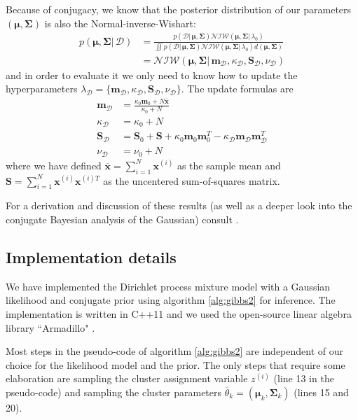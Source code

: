 \documentclass[final,3p,times,twocolumn]{elsarticle}
\let\bs\boldsymbol
\begin{document}
Because of conjugacy, we know that the posterior distribution of our parameters $(\bs\mu,\bs\Sigma)$ is also the Normal-inverse-Wishart:
\begin{equation}
\label{eqn:NIWpost}
\begin{split}
p(\bs\mu,\bs\Sigma|\,\mathcal{D}) &= \frac{p(\mathcal{D}|\,\bs\mu,\bs\Sigma)\mathcal{NIW}(\bs\mu,\bs\Sigma|\,\lambda_0)}{\iint p(\mathcal{D}|\,\bs\mu,\bs\Sigma)\mathcal{NIW}(\bs\mu,\bs\Sigma|\,\lambda_0)d(\bs\mu,\bs\Sigma)}\\
&= \mathcal{NIW}(\bs\mu,\bs\Sigma|\,\bs m_\mathcal{D},\kappa_\mathcal{D},\bs S_\mathcal{D},\nu_\mathcal{D})
\end{split}
\end{equation}
and in order to evaluate it we only need to know how to update the hyperparameters $\lambda_\mathcal{D} = \{\bs m_\mathcal{D},\kappa_\mathcal{D},\bs S_\mathcal{D},\nu_\mathcal{D}\}$.
The update formulas are
\begin{equation}
\begin{split}
\bs m_\mathcal{D} &= \frac{\kappa_0\bs m_0 + N \overline{\bs x}}{\kappa_0 + N}\\
\kappa_\mathcal{D} &= \kappa_0 + N\\
\bs S_\mathcal{D} &= \bs S_0 + \bs S + \kappa_0 \bs m_0 \bs m_0^T - \kappa_\mathcal{D} \bs m_\mathcal{D} \bs m_\mathcal{D}^T\\
\nu_\mathcal{D} &= \nu_0 + N
\end{split}
\end{equation}
where we have defined $\overline{\bs x} = \sum_{i=1}^N \bs x^{(i)}$ as the sample mean and $\bs S = \sum_{i=1}^N \bs x^{(i)} \bs x^{(i)T}$ as the uncentered sum-of-squares matrix.

For a derivation and discussion of these results (as well as a deeper look into the conjugate Bayesian analysis of the Gaussian) consult \cite{murphy2007}.

\subsection{Implementation details}
We have implemented the Dirichlet process mixture model with a Gaussian likelihood and conjugate prior using algorithm \ref{alg:gibbs2} for inference.
The implementation is written in C++11 and we used the open-source linear algebra library ``Armadillo" \cite{armadillo}.

Most steps in the pseudo-code of algorithm \ref{alg:gibbs2} are independent of our choice for the likelihood model and the prior. 
The only steps that require some elaboration are sampling the cluster assignment variable $z^{(i)}$ (line 13 in the pseudo-code) and sampling the cluster parameters $\overline\theta_k = \left(\bs\mu_k,\bs\Sigma_k\right)$ (lines 15 and 20).
\end{document}
